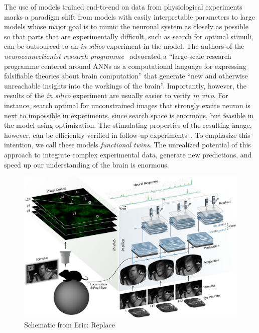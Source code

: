 \documentclass[B2,COG]{ercgrant}
\begin{document}
The use of models trained end-to-end on data from physiological experiments marks a paradigm shift from models with easily interpretable parameters to large models whose major goal is to mimic the neuronal system as closely as possible so that parts that are experimentally difficult, such as \eg search for optimal stimuli, can be outsourced to an \textit{in silico} experiment in the model. 
The authors of the \textit{neuroconnectionist research programme}~\parencite{Doerig2022-ex} advocated a ``large-scale research programme centered around ANNs as a computational language for expressing falsifiable theories about brain computation'' that generate ``new and otherwise unreachable insights into the workings of the brain''. 
Importantly, however, the results of the \textit{in silico} experiment are usually easier to verify \textit{in vivo}. 
For instance, search optimal for unconstrained images that strongly excite neuron is next to impossible in experiments, since search space is enormous, but feasible in the model using optimization.
The stimulating properties of the resulting image, however, can be efficiently verified in follow-up experiments~\parencite{Walker2019-yw}.
To emphasize this intention, we call these models \textit{functional twins}. 
The unrealized potential of this approach to integrate complex experimental data, generate new predictions, and speed up our understanding of the brain is enormous. 

\begin{figure}[t]
    \centering
    \includegraphics[width=.9\textwidth]{figures/architecure_v9.png}
    \caption{Schematic from Eric: Replace}
    \label{fig:videomodel}
\end{figure}
\end{document}
